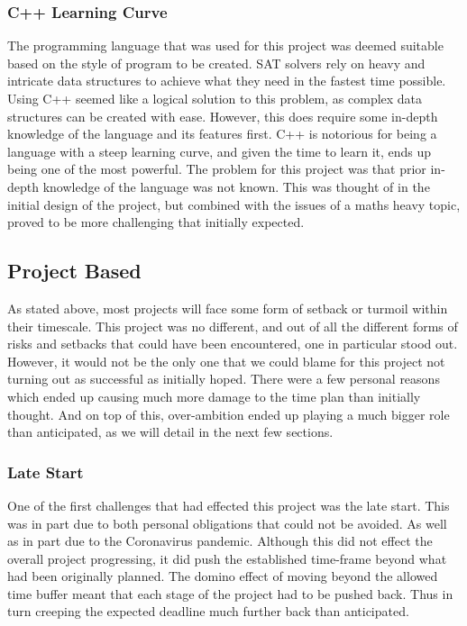 \documentclass{article}
\begin{document}
\subsubsection{C++ Learning Curve}
The programming language that was used for this project was deemed suitable based on the style of program to be created. SAT
solvers rely on heavy and intricate data structures to achieve what they need in the fastest time possible. Using C++ seemed like
a logical solution to this problem, as complex data structures can be created with ease. However, this does require some in-depth
knowledge of the language and its features first. C++ is notorious for being a language with a steep learning curve, and given the
time to learn it, ends up being one of the most powerful. The problem for this project was that prior in-depth knowledge of the
language was not known. This was thought of in the initial design of the project, but combined with the issues of a maths heavy
topic, proved to be more challenging that initially expected.

\subsection{Project Based}
As stated above, most projects will face some form of setback or turmoil within their timescale. This project was no different,
and out of all the different forms of risks and setbacks that could have been encountered, one in particular stood out. However,
it would not be the only one that we could blame for this project not turning out as successful as initially hoped. There were a
few personal reasons which ended up causing much more damage to the time plan than initially thought. And on top of this,
over-ambition ended up playing a much bigger role than anticipated, as we will detail in the next few sections.

\subsubsection{Late Start}
One of the first challenges that had effected this project was the late start. This was in part due to both personal obligations
that could not be avoided. As well as in part due to the Coronavirus pandemic. Although this did not effect the overall project
progressing, it did push the established time-frame beyond what had been originally planned. The domino effect of moving beyond
the allowed time buffer meant that each stage of the project had to be pushed back. Thus in turn creeping the expected deadline
much further back than anticipated.
\end{document}
